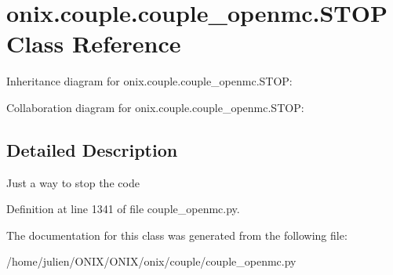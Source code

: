 \hypertarget{classonix_1_1couple_1_1couple__openmc_1_1STOP}{}\section{onix.\+couple.\+couple\+\_\+openmc.\+S\+T\+OP Class Reference}
\label{classonix_1_1couple_1_1couple__openmc_1_1STOP}


Inheritance diagram for onix.\+couple.\+couple\+\_\+openmc.\+S\+T\+OP\+:


Collaboration diagram for onix.\+couple.\+couple\+\_\+openmc.\+S\+T\+OP\+:


\subsection{Detailed Description}
\begin{DoxyVerb}Just a way to stop the code\end{DoxyVerb}
 

Definition at line 1341 of file couple\+\_\+openmc.\+py.



The documentation for this class was generated from the following file\+:\begin{DoxyCompactItemize}
\item 
/home/julien/\+O\+N\+I\+X/\+O\+N\+I\+X/onix/couple/couple\+\_\+openmc.\+py\end{DoxyCompactItemize}
